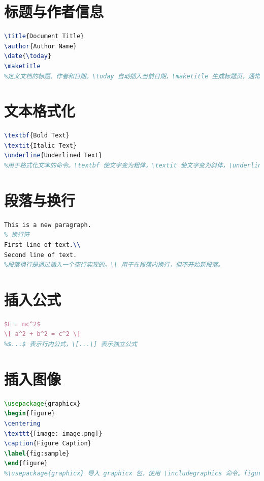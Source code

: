 \documentclass[a4paper, 12pt]{article}
\begin{document}
\section{标题与作者信息}
\begin{lstlisting}[language=TeX]
\title{Document Title}
\author{Author Name}
\date{\today}
\maketitle
%定义文档的标题、作者和日期。\today 自动插入当前日期，\maketitle 生成标题页，通常放在文档的开头部分。
\end{lstlisting}

\section{文本格式化}
\begin{lstlisting}[language=TeX]
\textbf{Bold Text} 
\textit{Italic Text} 
\underline{Underlined Text}
%用于格式化文本的命令。\textbf 使文字变为粗体，\textit 使文字变为斜体，\underline 为文字加下划线。可以在段落中任意位置使用。
\end{lstlisting}

\section{段落与换行}
\begin{lstlisting}[language=TeX]
% 空行表示段落换行
This is a new paragraph.
% 换行符
First line of text.\\
Second line of text.
%段落换行是通过插入一个空行实现的。\\ 用于在段落内换行，但不开始新段落。
\end{lstlisting}

\section{插入公式}
\begin{lstlisting}[language=TeX]
$E = mc^2$ 
\[ a^2 + b^2 = c^2 \]
%$...$ 表示行内公式，\[...\] 表示独立公式
\end{lstlisting}

\section{插入图像}
\begin{lstlisting}[language=TeX]
\usepackage{graphicx} 
\begin{figure}
\centering
\texttt{[image: image.png]}
\caption{Figure Caption}
\label{fig:sample}
\end{figure}
%\usepackage{graphicx} 导入 graphicx 包，使用 \includegraphics 命令。figure 环境用于包含图片，centering 用于居中显示，caption 设置图片标题，label 用于引用图片。
\end{lstlisting}
\end{document}
